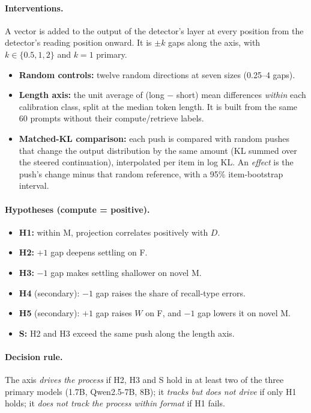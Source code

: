 \documentclass[11pt]{article}
\begin{document}
\paragraph{Interventions.} A vector is added to the output of the detector's layer at every position from the detector's reading position onward. It is $\pm k$ gaps along the axis, with $k \in \{0.5, 1, 2\}$ and $k=1$ primary.
\begin{itemize}
  \item \textbf{Random controls:} twelve random directions at seven sizes (0.25--4 gaps).
  \item \textbf{Length axis:} the unit average of (long $-$ short) mean differences \emph{within} each calibration class, split at the median token length. It is built from the same 60 prompts without their compute/retrieve labels.
  \item \textbf{Matched-KL comparison:} each push is compared with random pushes that change the output distribution by the same amount (KL summed over the steered continuation), interpolated per item in log KL. An \emph{effect} is the push's change minus that random reference, with a 95\% item-bootstrap interval.
\end{itemize}

\paragraph{Hypotheses (compute = positive).}
\begin{itemize}
  \item \textbf{H1:} within M, projection correlates positively with $D$.
  \item \textbf{H2:} $+1$ gap deepens settling on F.
  \item \textbf{H3:} $-1$ gap makes settling shallower on novel M.
  \item \textbf{H4} (secondary): $-1$ gap raises the share of recall-type errors.
  \item \textbf{H5} (secondary): $+1$ gap raises $W$ on F, and $-1$ gap lowers it on novel M.
  \item \textbf{S:} H2 and H3 exceed the same push along the length axis.
\end{itemize}

\paragraph{Decision rule.} The axis \emph{drives the process} if H2, H3 and S hold in at least two of the three primary models (1.7B, Qwen2.5-7B, 8B); it \emph{tracks but does not drive} if only H1 holds; it \emph{does not track the process within format} if H1 fails.
\end{document}
